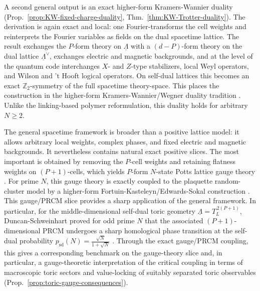 A second general output is an exact higher-form Kramers-Wannier duality
(Prop.~\ref{prop:KW-fixed-charge-duality},
Thm.~\ref{thm:KW-Trotter-duality}). The derivation is again exact and local: one
Fourier-transforms the cell weights and reinterprets the Fourier variables as
fields on the dual spacetime lattice. The result exchanges the \(P\)-form
theory on \(\underline\Lambda\) with a \((d-P)\)-form theory on the dual lattice
\(\underline\Lambda^\vee\), exchanges electric and magnetic backgrounds, and at
the level of the quantum code interchanges \(X\)- and \(Z\)-type stabilizers,
local Weyl operators, and Wilson and 't Hooft logical operators. On self-dual
lattices this becomes an exact \(\mathbb Z_2\)-symmetry of the full spacetime
theory-space. This places the construction in the
higher-form Kramers-Wannier/Wegner duality tradition
\cite{KramersWannier1941,Wegner:1971app,Savit1980,
	ElitzurPearsonShigemitsu1979,UkawaWindeyGuth1980,Cardy1982,
	CardyRabinovici1982,CobaneraOrtizNussinov2011,FreedTeleman2022,
	DelcampIshtiaque2024}. Unlike the linking-based polymer reformulation, this duality holds for
arbitrary \(N\ge 2\).

The general spacetime framework is broader than a positive lattice model: it
allows arbitrary local weights, complex phases, and fixed electric and magnetic
backgrounds. It nevertheless contains natural exact positive slices. The most
important is obtained by removing the \(P\)-cell weights and retaining flatness
weights on \((P+1)\)-cells, which yields \(P\)-form \(N\)-state Potts lattice
gauge theory \cite{Wegner:1971app,FradkinShenker1979,BanksRabinovici1979}. For
prime \(N\), this gauge theory is exactly coupled to the plaquette random-cluster
model by a higher-form Fortuin-Kasteleyn/Edwards-Sokal construction
\cite{FortuinKasteleyn1972,EdwardsSokal1988,HiraokaShirai2016,
	DuncanSchweinhartTopological,DuncanSchweinhartDeconfinement}. This
gauge/PRCM slice provides a sharp application of the general framework. In
particular, for the middle-dimensional self-dual toric geometry
\(\underline\Lambda=T_L^{\,2(P+1)}\), Duncan-Schweinhart proved for odd prime
\(N\) that the associated \((P+1)\)-dimensional PRCM undergoes a sharp
homological phase transition at the self-dual probability
\(p_{\mathrm{sd}}(N)=\frac{\sqrt N}{1+\sqrt N}\)
\cite{DuncanSchweinhartTopological}. Through the exact gauge/PRCM coupling, this
gives a corresponding benchmark on the gauge-theory slice and, in particular, a
gauge-theoretic interpretation of the critical coupling in terms of macroscopic
toric sectors and value-locking of suitably separated toric observables
(Prop.~\ref{prop:toric-gauge-consequences}).


